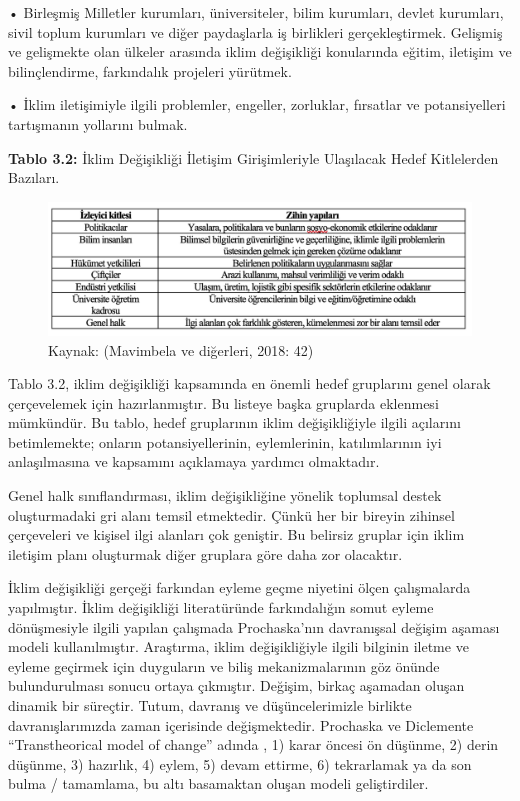 \documentclass[
]{book}
\begin{document}
• Birleşmiş Milletler kurumları, üniversiteler, bilim kurumları, devlet kurumları, sivil toplum kurumları ve diğer paydaşlarla iş birlikleri gerçekleştirmek. Gelişmiş ve gelişmekte olan ülkeler arasında iklim değişikliği konularında eğitim, iletişim ve bilinçlendirme, farkındalık projeleri yürütmek.

• İklim iletişimiyle ilgili problemler, engeller, zorluklar, fırsatlar ve potansiyelleri tartışmanın yollarını bulmak.

\textbf{Tablo 3.2:} İklim Değişikliği İletişim Girişimleriyle Ulaşılacak Hedef Kitlelerden Bazıları.

\begin{figure}
\includegraphics[width=0.95\linewidth,height=0.95\textheight]{tablolar-sekiller/tablo-3-2} \caption{Kaynak: (Mavimbela ve diğerleri, 2018: 42)}\label{fig:unnamed-chunk-4}
\end{figure}

Tablo 3.2, iklim değişikliği kapsamında en önemli hedef gruplarını genel olarak çerçevelemek için hazırlanmıştır. Bu listeye başka gruplarda eklenmesi mümkündür. Bu tablo, hedef gruplarının iklim değişikliğiyle ilgili açılarını betimlemekte; onların potansiyellerinin, eylemlerinin, katılımlarının iyi anlaşılmasına ve kapsamını açıklamaya yardımcı olmaktadır.

Genel halk sınıflandırması, iklim değişikliğine yönelik toplumsal destek oluşturmadaki gri alanı temsil etmektedir. Çünkü her bir bireyin zihinsel çerçeveleri ve kişisel ilgi alanları çok geniştir. Bu belirsiz gruplar için iklim iletişim planı oluşturmak diğer gruplara göre daha zor olacaktır.

İklim değişikliği gerçeği farkından eyleme geçme niyetini ölçen çalışmalarda yapılmıştır. İklim değişikliği literatüründe farkındalığın somut eyleme dönüşmesiyle ilgili yapılan çalışmada Prochaska'nın davranışsal değişim aşaması modeli kullanılmıştır. Araştırma, iklim değişikliğiyle ilgili bilginin iletme ve eyleme geçirmek için duyguların ve biliş mekanizmalarının göz önünde bulundurulması sonucu ortaya çıkmıştır. \citep{trolliet2019awareness} Değişim, birkaç aşamadan oluşan dinamik bir süreçtir. Tutum, davranış ve düşüncelerimizle birlikte davranışlarımızda zaman içerisinde değişmektedir. Prochaska ve Diclemente ``Transtheorical model of change'' adında \citep{prochaska1983stages}, 1) karar öncesi ön düşünme, 2) derin düşünme, 3) hazırlık, 4) eylem, 5) devam ettirme, 6) tekrarlamak ya da son bulma / tamamlama, bu altı basamaktan oluşan modeli geliştirdiler.
\end{document}
